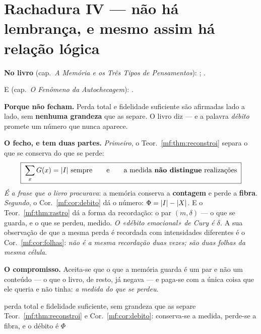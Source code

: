 \documentclass[../livro.tex]{subfiles}
\begin{document}
\section{Rachadura IV --- não há lembrança, e mesmo assim há relação lógica}\label{mf:r4}

\noindent\textbf{No livro} (cap.~\emph{A Memória e os Três Tipos de
Pensamentos}): ; .

\noindent E (cap.~\emph{O Fenômeno da Autochecagem}): .

\medskip\noindent\textbf{Porque não fecham.} Perda total e fidelidade suficiente
são afirmadas lado a lado, sem \textbf{nenhuma grandeza} que as separe. O livro
diz  --- e a palavra \emph{débito} promete um número que nunca aparece.

\medskip\noindent\textbf{O fecho, e tem duas partes.} \emph{Primeiro}, o
Teor.~\ref{mf:thm:reconstroi} separa o que se conserva do que se perde:
\[
\boxed{\;\sum_x G(x)=\lvert I\rvert\ \text{sempre}
\qquad\text{e}\qquad
\text{a medida \textbf{não distingue} realizações}\;}
\]
\emph{É a frase que o livro procurava}: a memória conserva a \textbf{contagem} e
perde a \textbf{fibra}. \emph{Segundo}, o Cor.~\ref{mf:cor:debito} dá o número:
$\Phi=\lvert I\rvert-\lvert X\rvert$. E o Teor.~\ref{mf:thm:rastro} dá a forma da recordação:
o par $(m,\delta)$ --- o que se guarda, e o que se perdeu, medido. \emph{O
«débito emocional» de Cury é $\delta$.} A sua observação de que a mesma perda é
recordada com intensidades diferentes é o Cor.~\ref{mf:cor:folhas}: \emph{não é a
mesma recordação duas vezes; são duas folhas da mesma célula}.

\medskip\noindent\textbf{O compromisso.} Aceita-se que o que a memória guarda é
um par e não um conteúdo --- o que o livro, de resto, já negava --- e paga-se com
a única coisa que ele queria e não tinha: \emph{a medida do que se perdeu}.

      {perda total e fidelidade suficiente, sem grandeza que as separe}
      {Teor.~\ref{mf:thm:reconstroi} e Cor.~\ref{mf:cor:debito}: conserva-se a
       medida, perde-se a fibra, e o débito é $\Phi$}
\end{document}
